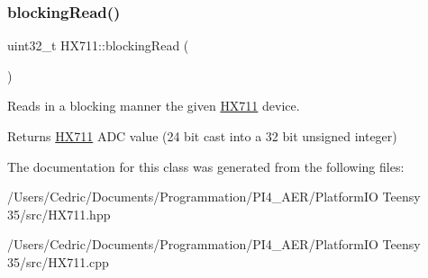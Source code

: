 \subsubsection{\texorpdfstring{blocking\+Read()}{blockingRead()}}
{\footnotesize\ttfamily uint32\+\_\+t H\+X711\+::blocking\+Read (\begin{DoxyParamCaption}{ }\end{DoxyParamCaption})}



Reads in a blocking manner the given \hyperlink{class_h_x711}{H\+X711} device. 

\begin{DoxyReturn}{Returns}
\hyperlink{class_h_x711}{H\+X711} A\+DC value (24 bit cast into a 32 bit unsigned integer) 
\end{DoxyReturn}


The documentation for this class was generated from the following files\+:\begin{DoxyCompactItemize}
\item 
/\+Users/\+Cedric/\+Documents/\+Programmation/\+P\+I4\+\_\+\+A\+E\+R/\+Platform\+I\+O Teensy 35/src/H\+X711.\+hpp\item 
/\+Users/\+Cedric/\+Documents/\+Programmation/\+P\+I4\+\_\+\+A\+E\+R/\+Platform\+I\+O Teensy 35/src/H\+X711.\+cpp\end{DoxyCompactItemize}
